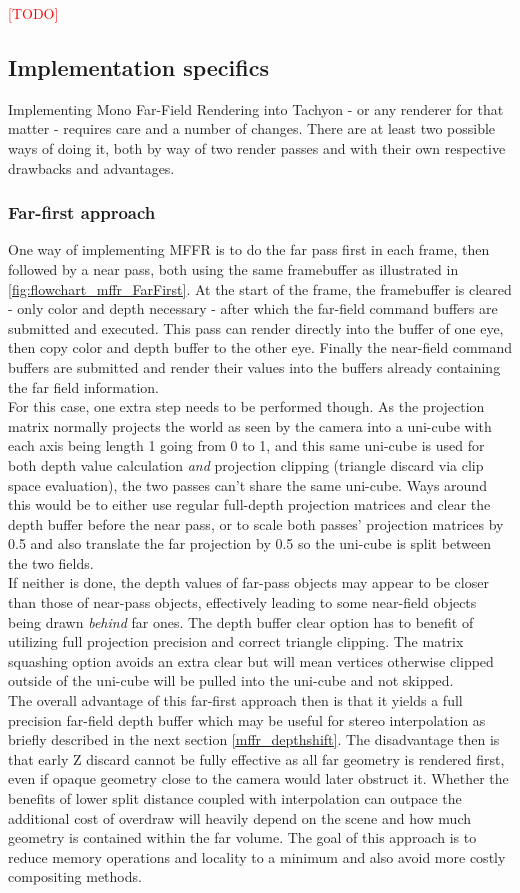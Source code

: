 \textcolor{red}{[TODO]}

\subsection{Implementation specifics}
Implementing Mono Far-Field Rendering into Tachyon - or any renderer for that matter - requires care and a number of changes. There are at least two possible ways of doing it, both by way of two render passes and with their own respective drawbacks and advantages. 
\subsubsection{Far-first approach}
One way of implementing MFFR is to do the far pass first in each frame, then followed by a near pass, both using the same framebuffer as illustrated in \autoref{fig:flowchart_mffr_FarFirst}. At the start of the frame, the framebuffer is cleared - only color and depth necessary - after which the far-field command buffers are submitted and executed. This pass can render directly into the buffer of one eye, then copy color and depth buffer to the other eye. Finally the near-field command buffers are submitted and render their values into the buffers already containing the far field information. \\
For this case, one extra step needs to be performed though. As the projection matrix normally projects the world as seen by the camera into a uni-cube with each axis being length 1 going from 0 to 1, and this same uni-cube is used for both depth value calculation \textit{and} projection clipping (triangle discard via clip space evaluation), the two passes can't share the same uni-cube. Ways around this would be to either use regular full-depth projection matrices and clear the depth buffer before the near pass, or to scale both passes' projection matrices by 0.5 and also translate the far projection by 0.5 so the uni-cube is split between the two fields. \\
If neither is done, the depth values of far-pass objects may appear to be closer than those of near-pass objects, effectively leading to some near-field objects being drawn \textit{behind} far ones. 
The depth buffer clear option has to benefit of utilizing full projection precision and correct triangle clipping. The matrix squashing option avoids an extra clear but will mean vertices otherwise clipped outside of the uni-cube will be pulled into the uni-cube and not skipped. \\
The overall advantage of this far-first approach then is that it yields a full precision far-field depth buffer which may be useful for stereo interpolation as briefly described in the next section \autoref{mffr_depthshift}. The disadvantage then is that early Z discard cannot be fully effective as all far geometry is rendered first, even if opaque geometry close to the camera would later obstruct it. Whether the benefits of lower split distance coupled with interpolation can outpace the additional cost of overdraw will heavily depend on the scene and how much geometry is contained within the far volume. 
The goal of this approach is to reduce memory operations and locality to a minimum and also avoid more costly compositing methods. 
